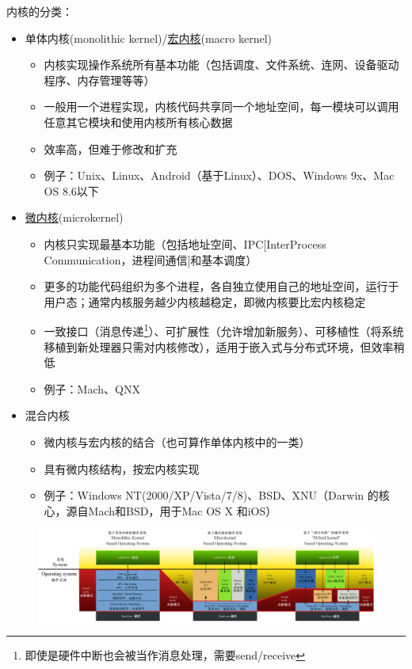 内核的分类：
\begin{itemize}
	\item 单体内核(monolithic kernel)/\underline{宏内核}(macro kernel)
	\begin{itemize}
		\item 内核实现操作系统所有基本功能（包括调度、文件系统、连网、设备驱动程序、内存管理等等）
		\item 一般用一个进程实现，内核代码共享同一个地址空间，每一模块可以调用任意其它模块和使用内核所有核心数据
		\item 效率高，但难于修改和扩充
		\item 例子：Unix、Linux、Android（基于Linux）、DOS、Windows 9x、Mac OS 8.6以下
	\end{itemize}
	\item \underline{微内核}(microkernel)
	\begin{itemize}
		\item 内核只实现最基本功能（包括地址空间、IPC[InterProcess Communication，进程间通信]和基本调度）
		\item 更多的功能代码组织为多个进程，各自独立使用自己的地址空间，运行于用户态；通常内核服务越少内核越稳定，即微内核要比宏内核稳定
		\item 一致接口（消息传递\footnote{即使是硬件中断也会被当作消息处理，需要send/receive}）、可扩展性（允许增加新服务）、可移植性（将系统移植到新处理器只需对内核修改），适用于嵌入式与分布式环境，但效率稍低
		\item 例子：Mach、QNX
	\end{itemize}
	\item 混合内核
	\begin{itemize}
		\item 微内核与宏内核的结合（也可算作单体内核中的一类）
		\item 具有微内核结构，按宏内核实现
		\item 例子：Windows NT(2000/XP/Vista/7/8)、BSD、XNU（Darwin 的核心，源自Mach和BSD，用于Mac OS X 和iOS）
	\end{itemize}
\end{itemize}
\begin{figure}[H]
	\centering
	\includegraphics[width=\linewidth]{fig/kernels.png}
\end{figure}


